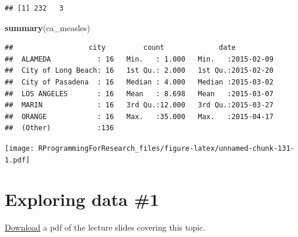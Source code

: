 \documentclass[]{book}
\makeatletter
\newenvironment{Shaded}{\begin{snugshade}}{\end{snugshade}}
\newcommand{\KeywordTok}[1]{\textcolor[rgb]{0.13,0.29,0.53}{\textbf{#1}}}
\newcommand{\DataTypeTok}[1]{\textcolor[rgb]{0.13,0.29,0.53}{#1}}
\newcommand{\StringTok}[1]{\textcolor[rgb]{0.31,0.60,0.02}{#1}}
\newcommand{\OperatorTok}[1]{\textcolor[rgb]{0.81,0.36,0.00}{\textbf{#1}}}
\newcommand{\NormalTok}[1]{#1}
\newenvironment{kframe}{%
\medskip{}
\setlength{\fboxsep}{.8em}
 \def\at@end@of@kframe{}%
 \ifinner\ifhmode%
  \def\at@end@of@kframe{\end{minipage}}%
  \begin{minipage}{\columnwidth}%
 \fi\fi%
 \def\FrameCommand##1{\hskip\@totalleftmargin \hskip-\fboxsep
 \colorbox{shadecolor}{##1}\hskip-\fboxsep
     \hskip-\linewidth \hskip-\@totalleftmargin \hskip\columnwidth}%
 \MakeFramed {\advance\hsize-\width
   \@totalleftmargin\z@ \linewidth\hsize
   \@setminipage}}%
 {\par\unskip\endMakeFramed%
 \at@end@of@kframe}
\renewenvironment{Shaded}{\begin{kframe}}{\end{kframe}}
\theoremstyle{definition}
\theoremstyle{definition}
\theoremstyle{definition}
\theoremstyle{remark}
\makeatother
\begin{document}
\begin{verbatim}
## [1] 232   3
\end{verbatim}

\begin{Shaded}
\begin{Highlighting}[]
\KeywordTok{summary}\NormalTok{(ca_measles)}
\end{Highlighting}
\end{Shaded}

\begin{verbatim}
##                  city         count             date           
##  ALAMEDA           : 16   Min.   : 1.000   Min.   :2015-02-09  
##  City of Long Beach: 16   1st Qu.: 2.000   1st Qu.:2015-02-20  
##  City of Pasadena  : 16   Median : 4.000   Median :2015-03-02  
##  LOS ANGELES       : 16   Mean   : 8.698   Mean   :2015-03-07  
##  MARIN             : 16   3rd Qu.:12.000   3rd Qu.:2015-03-27  
##  ORANGE            : 16   Max.   :35.000   Max.   :2015-04-17  
##  (Other)           :136
\end{verbatim}

\begin{Shaded}
\end{Shaded}

\texttt{[image: RProgrammingForResearch\_files/figure-latex/unnamed-chunk-131-1.pdf]}

\chapter{Exploring data \#1}\label{exploring-data-1}

\href{https://github.com/geanders/RProgrammingForResearch/raw/master/slides/CourseNotes_Week3.pdf}{Download}
a pdf of the lecture slides covering this topic.
\end{document}
